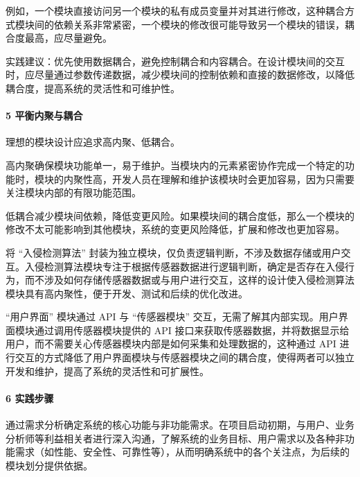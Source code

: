 例如，一个模块直接访问另一个模块的私有成员变量并对其进行修改，这种耦合方式模块间的依赖关系非常紧密，一个模块的修改很可能导致另一个模块的错误，耦合度最高，应尽量避免。

实践建议：优先使用数据耦合，避免控制耦合和内容耦合。在设计模块间的交互时，应尽量通过参数传递数据，减少模块间的控制依赖和直接的数据修改，以降低耦合度，提高系统的灵活性和可维护性。

\hypertarget{ux5e73ux8861ux5185ux805aux4e0eux8026ux5408}{%
\paragraph{5 平衡内聚与耦合}\label{ux5e73ux8861ux5185ux805aux4e0eux8026ux5408}}

理想的模块设计应追求高内聚、低耦合。

高内聚确保模块功能单一，易于维护。当模块内的元素紧密协作完成一个特定的功能时，模块的内聚性高，开发人员在理解和维护该模块时会更加容易，因为只需要关注模块内部的有限功能范围。

低耦合减少模块间依赖，降低变更风险。如果模块间的耦合度低，那么一个模块的修改不太可能影响到其他模块，系统的变更风险降低，扩展和修改也更加容易。


将 ``入侵检测算法'' 封装为独立模块，仅负责逻辑判断，不涉及数据存储或用户交互。入侵检测算法模块专注于根据传感器数据进行逻辑判断，确定是否存在入侵行为，而不涉及如何存储传感器数据或与用户进行交互，这样的设计使入侵检测算法模块具有高内聚性，便于开发、测试和后续的优化改进。

``用户界面'' 模块通过 API 与 ``传感器模块'' 交互，无需了解其内部实现。用户界面模块通过调用传感器模块提供的 API 接口来获取传感器数据，并将数据显示给用户，而不需要关心传感器模块内部是如何采集和处理数据的，这种通过 API 进行交互的方式降低了用户界面模块与传感器模块之间的耦合度，使得两者可以独立开发和维护，提高了系统的灵活性和可扩展性。

\hypertarget{ux5b9eux8df5ux6b65ux9aa4}{%
\paragraph{6 实践步骤}\label{ux5b9eux8df5ux6b65ux9aa4}}

通过需求分析确定系统的核心功能与非功能需求。在项目启动初期，与用户、业务分析师等利益相关者进行深入沟通，了解系统的业务目标、用户需求以及各种非功能需求（如性能、安全性、可靠性等），从而明确系统中的各个关注点，为后续的模块划分提供依据。

